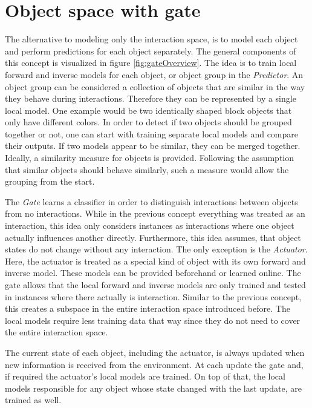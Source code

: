 \section{Object space with gate \label{sec:gate}}

The alternative to modeling only the interaction space, is to model each object and perform predictions for each object separately. The general components of this concept is visualized in figure \ref{fig:gateOverview}.
The idea is to train local forward and inverse models for each object, or object group in the \textit{Predictor}. %
An object group can be considered a collection of objects that are similar in the way they behave during interactions. Therefore they can be represented by a single local model. One example would be two identically shaped block objects that only have different colors. In order to detect if two objects should be grouped together or not, one can start with training separate local models and compare their outputs. If two models appear to be similar, they can be merged together. Ideally, a similarity measure for objects is provided. Following the assumption that similar objects should behave similarly, such a measure would allow the grouping from the start. 

The \textit{Gate} learns a classifier in order to distinguish interactions between objects from no interactions. While in the previous concept everything was treated as an interaction, this idea only considers instances as interactions where one object actually influences another directly. Furthermore, this idea assumes, that object states do not change without any interaction. The only exception is the \textit{Actuator}. Here, the actuator is treated as a special kind of object with its own forward and inverse model. These models can be provided beforehand or learned online. 
The gate allows that the local forward and inverse models are only trained and tested in instances where there actually is interaction. Similar to the previous concept, this creates a subspace in the entire interaction space introduced before. The local models require less training data that way since they do not need to cover the entire interaction space. 

The current state of each object, including the actuator, is always updated when new information is received from the environment. At each update the gate and, if required the actuator's local models are trained. On top of that, the local models responsible for any object whose state changed with the last update, are trained as well.


